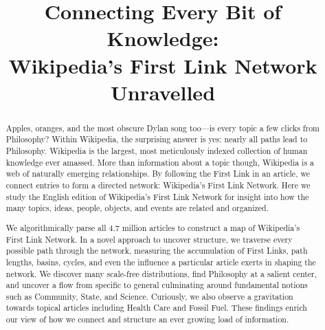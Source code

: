 \documentclass[pre,twocolumn,twoside,superscriptaddress,floatfix, aps, 10pt]{revtex4-1}
\begin{document}
\title{\protect
Connecting Every Bit of Knowledge: \\
Wikipedia's First Link Network Unravelled
}

\author{
}


\author{
}


\author{
}



\begin{abstract}
  \protect
Apples, oranges, and the most obscure Dylan song too---is every topic a few clicks from Philosophy? 
Within Wikipedia, the surprising answer is yes: nearly all 
paths lead to Philosophy.
Wikipedia is the largest, most meticulously indexed collection of human knowledge ever amassed. 
More than information about a topic though, Wikipedia is a web of naturally emerging relationships.  
By following the First Link in an article, we connect entries to form a directed network: Wikipedia's First Link Network. 
Here we study the English edition of Wikipedia's First Link Network for insight into how the many topics, ideas, people, objects, and events
are related and organized.  


We algorithmically parse all 4.7 million articles to construct a map of Wikipedia's First Link Network. 
In a novel approach to uncover structure, we traverse every possible path through the network, 
measuring the accumulation of First Links, path lengths, basins, cycles, and even the influence a particular article exerts in shaping the 
network.
We discover many scale-free distributions, find Philosophy at a salient center, and uncover a flow from specific to general 
culminating around fundamental notions such as Community, State, and Science. 
Curiously, we also observe a gravitation towards topical articles including Health Care and Fossil Fuel.
These findings enrich our view of how we connect and structure
an ever growing load of information.
 
\end{abstract}
\end{document}
